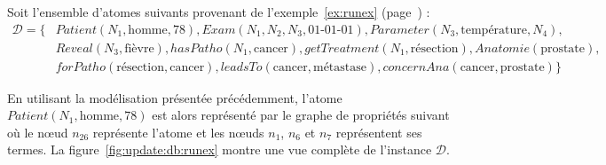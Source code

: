 \begin{example}
    Soit l'ensemble d'atomes suivants provenant de l'exemple~\ref{ex:runex} (page~\pageref{ex:runex}) :
    \begin{align*}
        \mathcal{D} = \{ & Patient(N_1, \text{homme}, 78), Exam(N_1, N_2, N_3, \text{01-01-01}), Parameter(N_3, \text{température}, N_4), \\
                        & Reveal(N_3, \text{fièvre}), hasPatho(N_1, \text{cancer}), getTreatment(N_1, \text{résection}), Anatomie(\text{prostate}), \\
                        & forPatho(\text{résection}, \text{cancer}), leadsTo(\text{cancer}, \text{métastase}), concernAna(\text{cancer}, \text{prostate}) \}
    \end{align*}

    En utilisant la modélisation présentée précédemment, l'atome $Patient(N_1, \text{homme}, 78)$ est alors représenté par le graphe de propriétés suivant où le nœud $n_{26}$ représente l'atome et les nœuds $n_1$, $n_6$ et $n_7$ représentent ses termes.
    La figure~\ref{fig:update:db:runex} montre une vue complète de l'instance $\mathcal{D}$.

    \begin{center}
    \end{center}
\end{example}

